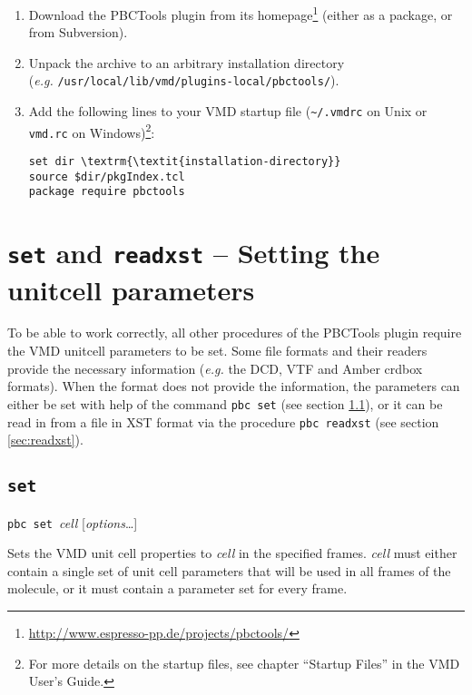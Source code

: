 \documentclass[a4paper, DIV12]{scrartcl}
\newcommand{\eg}{\emph{e.g.}\xspace}
\newcommand{\pbctools}{PBCTools\xspace}
\begin{document}
\begin{enumerate}
\item Download the \pbctools plugin from its
  homepage\footnote{\url{http://www.espresso-pp.de/projects/pbctools/}}
  (either as a package, or from Subversion).
\item Unpack the archive to an arbitrary installation directory\\ (\eg
  \verb!/usr/local/lib/vmd/plugins-local/pbctools/!).
\item Add the following lines to your VMD startup file
  (\verb!~/.vmdrc! on Unix or \verb!vmd.rc! on Windows)\footnote{For
    more details on the startup files, see chapter ``Startup Files''
    in the VMD User's Guide.}:
\begin{Verbatim}
set dir \textrm{\textit{installation-directory}}
source $dir/pkgIndex.tcl
package require pbctools
\end{Verbatim}
\end{enumerate}

\newpage
\section{\texttt{set} and \texttt{readxst} -- Setting the unitcell
  parameters}

To be able to work correctly, all other procedures of the \pbctools
plugin require the VMD unitcell parameters to be set.  Some file
formats and their readers provide the necessary information (\eg the
DCD, VTF and Amber crdbox formats).  When the format does not provide
the information, the parameters can either be set with help of the
command \texttt{pbc set} (see section \ref{sec:set}), or it can be
read in from a file in XST format via the procedure \texttt{pbc
  readxst} (see section \ref{sec:readxst}).

\subsection{\texttt{set}}
\label{sec:set}

\mbox{\texttt{pbc} \texttt{set} \textit{cell}} [\textit{options}\dots]


Sets the VMD unit cell properties to \textit{cell} in the specified
frames. \textit{cell} must either contain a single set of unit cell
parameters that will be used in all frames of the molecule, or it must
contain a parameter set for every frame.
\end{document}
